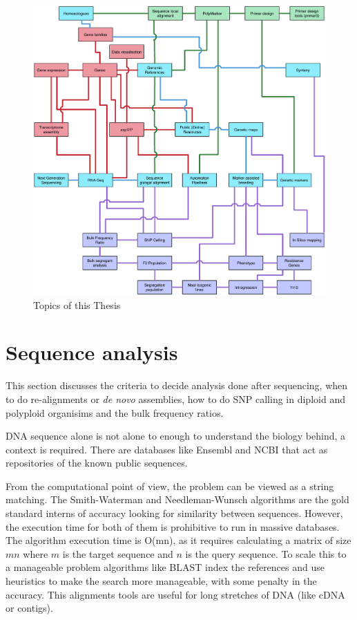 \begin{figure}
\centering
\includegraphics[width=1\textwidth]{Introduction/RicardoThesisTopics.pdf}
\caption{Topics of this Thesis}
\end{figure}


\section{Sequence analysis}
This section discusses the criteria to decide analysis done after sequencing, when to do re-alignments or \textit{de novo} assemblies, how to do SNP calling in diploid and polyploid organisims and the bulk frequency ratios.  



DNA sequence alone is not alone to enough to understand the biology behind, a context is required. There are databases like Ensembl and NCBI that act as repositories of the known public sequences. 

From the computational point of view, the problem can be viewed as a string matching. The Smith-Waterman\cite{Smith1981} and Needleman-Wunsch\cite{Needleman1970} algorithms are the gold standard interns of accuracy looking for similarity between sequences. However, the execution time for both of them is prohibitive to run in massive databases. The algorithm execution time is O(mn), as it requires calculating a matrix of size $mn$ where $m$ is the target sequence and $n$ is the query sequence.  To scale this to a manageable problem algorithms like BLAST index the references and use heuristics to make the search more manageable, with some penalty in the accuracy. This alignments tools are useful for long stretches of DNA (like cDNA or contigs)\cite{Altschul1990}.

